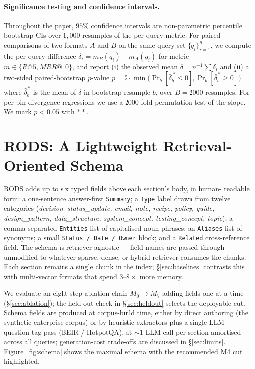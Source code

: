 \documentclass[11pt]{article}
\begin{document}
\paragraph{Significance testing and confidence intervals.}
Throughout the paper, $95\%$ confidence intervals are non-parametric
percentile bootstrap CIs over $1{,}000$ resamples of the per-query
metric. For paired comparisons of two formats $A$ and $B$ on the same
query set $\{q_i\}_{i=1}^{n}$, we compute the per-query difference
$\delta_i = m_B(q_i) - m_A(q_i)$ for metric $m \in \{R@5, MRR@10\}$,
and report (i) the observed mean $\bar{\delta} = n^{-1}\sum \delta_i$
and (ii) a two-sided paired-bootstrap $p$-value
$p = 2 \cdot \min\bigl(\Pr_b[\bar{\delta}^{\,\ast}_{b} \leq 0],
\Pr_b[\bar{\delta}^{\,\ast}_{b} \geq 0]\bigr)$
where $\bar{\delta}^{\,\ast}_{b}$ is the mean of $\delta$ in
bootstrap resample $b$, over $B{=}2000$ resamples. For per-bin
divergence regressions we use a $2000$-fold permutation test of the
slope. We mark $p{<}0.05$ with $**$.

\section{RODS: A Lightweight Retrieval-Oriented Schema}
\label{sec:schema}

RODS adds up to six typed fields above each section's body, in human-
readable form: a one-sentence answer-first \texttt{Summary}; a
\texttt{Type} label drawn from twelve categories (\emph{decision,
status\_update, email, note, recipe, policy, guide, design\_pattern,
data\_structure, system\_concept, testing\_concept, topic}); a
comma-separated \texttt{Entities} list of capitalised noun phrases;
an \texttt{Aliases} list of synonyms; a small \texttt{Status / Date
/ Owner} block; and a \texttt{Related} cross-reference field. The
schema is retriever-agnostic --- field names are passed through
unmodified to whatever sparse, dense, or hybrid retriever consumes
the chunks. Each section remains a single chunk in the index;
\S\ref{sec:baselines} contrasts this with multi-vector formats that
spend $3$--$8\times$ more memory.

We evaluate an eight-step ablation chain $M_0 \to M_7$ adding fields
one at a time (\S\ref{sec:ablation}); the held-out check in
\S\ref{sec:heldout} selects the deployable cut. Schema fields are
produced at corpus-build time, either by direct authoring (the
synthetic enterprise corpus) or by heuristic extractors plus a single
LLM question-tag pass (BEIR / HotpotQA), at $\sim 1$ LLM call per
section amortised across all queries; generation-cost trade-offs are
discussed in \S\ref{sec:limits}. Figure~\ref{fig:schema} shows the
maximal schema with the recommended M4 cut highlighted.
\end{document}
